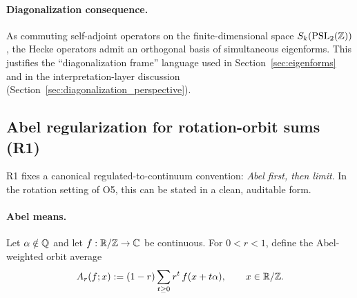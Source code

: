 \paragraph{Diagonalization consequence.}
As commuting self-adjoint operators on the finite-dimensional space $S_k(\mathrm{PSL}_2(\mathbb{Z}))$, the Hecke operators admit an orthogonal basis of simultaneous eigenforms. This justifies the ``diagonalization frame'' language used in Section~\ref{sec:eigenforms} and in the interpretation-layer discussion (Section~\ref{sec:diagonalization_perspective}).

\subsection{Abel regularization for rotation-orbit sums (R1)}
\label{app:abel_regularization}

R1 fixes a canonical regulated-to-continuum convention: \emph{Abel first, then limit}. In the rotation setting of O5, this can be stated in a clean, auditable form.

\paragraph{Abel means.}
Let $\alpha\notin\mathbb{Q}$ and let $f:\mathbb{R}/\mathbb{Z}\to\mathbb{C}$ be continuous. For $0<r<1$, define the Abel-weighted orbit average
\begin{equation}
A_r(f;x)
:=
(1-r)\sum_{t\ge 0} r^t\, f(x+t\alpha),
\qquad x\in\mathbb{R}/\mathbb{Z}.
\end{equation}
